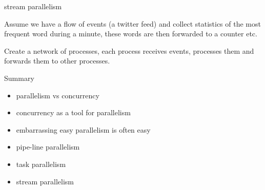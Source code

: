\begin{frame}{stream parallelism}

  Assume we have a flow of events (a twitter feed) and collect
  statistics of the most frequent word during a minute, these words
  are then forwarded to a counter etc.

\pause\vspace{10pt}

  Create a network of processes, each process receives events,
  processes them and forwards them to other processes.

\pause\vspace{20pt}{\em Apache Storm.}


\end{frame}

\begin{frame}{Summary}


\begin{itemize}
\pause\item parallelism vs concurrency
\pause\item concurrency as a tool for parallelism 
\pause\item embarrassing easy parallelism is often easy
\pause\item pipe-line parallelism 
\pause\item task parallelism 
\pause\item stream parallelism
\end{itemize}

\end{frame}


